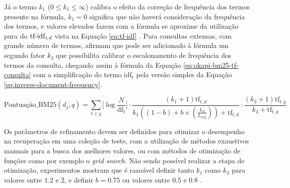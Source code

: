         Já o termo $k_1$ ($0 \leq k_1 \leq \infty$) calibra o efeito da correção de frequência dos termos presente na fórmula, $k_1=0$ significa que não haverá consideração da frequência dos termos, e valores elevados fazem com a fórmula se aproxime da utilização pura do $\text{tf-idf}_{\text{\textit{t},\textit{d}}}$ vista na Equação \ref{eq:tf-idf} \cite[p.~214]{Manning2008IIR}.
        Para consultas extensas, com grande número de termos,  afirmam que pode ser adicionado à fórmula um segundo fator $k_3$ que possibilita calibrar o escalonamento de frequência dos termos da consulta, chegando assim à fórmula da Equação \ref{eq:okapi-bm25-tf-consulta} com a simplificação do termo $\text{idf}_{t}$ pela versão simples da Equação \ref{eq:inverse-document-frequency}.
        
        \begin{equation}
            \label{eq:okapi-bm25-tf-consulta}
    		\text{Pontuação\_BM25}(d_j, q) = 
    		\sum_{t \in q} 
    		\Bigg[ \log{\frac{N}{\text{df}_{t}}} \Bigg]
    		\cdot 
    		\frac{(k_1 + 1) \text{tf}_{t,d}}{k_1((1-b)+b \times (\frac{L_d}{L_{\text{avg}}})) + \text{tf}_{t,d}} \cdot 
    		\frac{(k_3+1) \text{tf}_{t,q}}{k_3 + \text{tf}_{t,q}}
        \end{equation}
        
        Os parâmetros de refinamento devem ser definidos para otimizar o desempenho na recuperação em uma coleção de teste, com a utilização de métodos exaustivos manuais para a busca dos melhores valores, ou com métodos de otimização de funções como por exemplo o \textit{grid search}. 
        Não sendo possível realizar a etapa de otimização, experimentos mostram que é razoável definir tanto $k_1$ como $k_3$ para valores entre $1.2$ e $2$, e definir $b = 0.75$ ou valores entre $0.5$ e $0.8$ \cite[p.~215]{Manning2008IIR} \cite[p.~360--361]{robertson_probabilistic_2010}.
        
